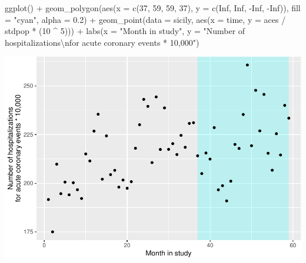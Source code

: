 \documentclass[
]{book}
\newenvironment{Shaded}{\begin{snugshade}}{\end{snugshade}}
\newcommand{\AttributeTok}[1]{\textcolor[rgb]{0.77,0.63,0.00}{#1}}
\newcommand{\ConstantTok}[1]{\textcolor[rgb]{0.00,0.00,0.00}{#1}}
\newcommand{\DecValTok}[1]{\textcolor[rgb]{0.00,0.00,0.81}{#1}}
\newcommand{\FloatTok}[1]{\textcolor[rgb]{0.00,0.00,0.81}{#1}}
\newcommand{\FunctionTok}[1]{\textcolor[rgb]{0.00,0.00,0.00}{#1}}
\newcommand{\NormalTok}[1]{#1}
\newcommand{\SpecialCharTok}[1]{\textcolor[rgb]{0.00,0.00,0.00}{#1}}
\newcommand{\StringTok}[1]{\textcolor[rgb]{0.31,0.60,0.02}{#1}}
\begin{document}
\begin{Shaded}
\begin{Highlighting}[]
\FunctionTok{ggplot}\NormalTok{() }\SpecialCharTok{+} 
  \FunctionTok{geom\_polygon}\NormalTok{(}\FunctionTok{aes}\NormalTok{(}\AttributeTok{x =} \FunctionTok{c}\NormalTok{(}\DecValTok{37}\NormalTok{, }\DecValTok{59}\NormalTok{, }\DecValTok{59}\NormalTok{, }\DecValTok{37}\NormalTok{), }
                   \AttributeTok{y =} \FunctionTok{c}\NormalTok{(}\ConstantTok{Inf}\NormalTok{, }\ConstantTok{Inf}\NormalTok{, }\SpecialCharTok{{-}}\ConstantTok{Inf}\NormalTok{, }\SpecialCharTok{{-}}\ConstantTok{Inf}\NormalTok{)), }
               \AttributeTok{fill =} \StringTok{"cyan"}\NormalTok{, }\AttributeTok{alpha =} \FloatTok{0.2}\NormalTok{) }\SpecialCharTok{+} 
  \FunctionTok{geom\_point}\NormalTok{(}\AttributeTok{data =}\NormalTok{ sicily, }\FunctionTok{aes}\NormalTok{(}\AttributeTok{x =}\NormalTok{ time, }\AttributeTok{y =}\NormalTok{ aces }\SpecialCharTok{/}\NormalTok{ stdpop }\SpecialCharTok{*}\NormalTok{ (}\DecValTok{10} \SpecialCharTok{\^{}} \DecValTok{5}\NormalTok{))) }\SpecialCharTok{+} 
  \FunctionTok{labs}\NormalTok{(}\AttributeTok{x =} \StringTok{"Month in study"}\NormalTok{, }
       \AttributeTok{y =} \StringTok{"Number of hospitalizations}\SpecialCharTok{\textbackslash{}n}\StringTok{for acute coronary events * 10,000"}\NormalTok{)}
\end{Highlighting}
\end{Shaded}

\includegraphics{adv_epi_analysis_files/figure-latex/unnamed-chunk-125-1.pdf}
\end{document}
